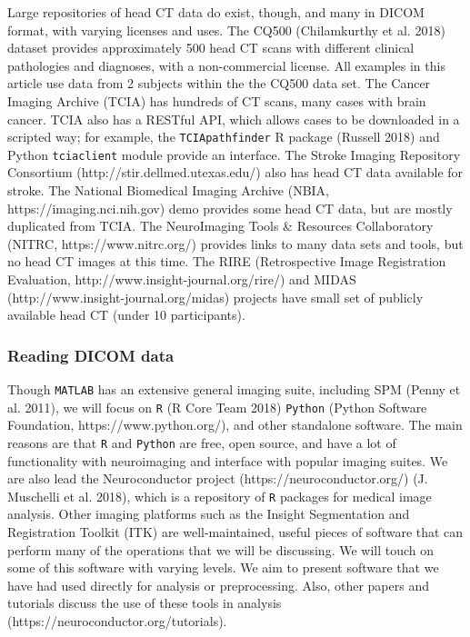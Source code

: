 \documentclass[]{elsarticle} %
\begin{document}
Large repositories of head CT data do exist, though, and many in DICOM format, with varying licenses and uses. The CQ500 (Chilamkurthy et al. 2018) dataset provides approximately 500 head CT scans with different clinical pathologies and diagnoses, with a non-commercial license. All examples in this article use data from 2 subjects within the the CQ500 data set. The Cancer Imaging Archive (TCIA) has hundreds of CT scans, many cases with brain cancer. TCIA also has a RESTful API, which allows cases to be downloaded in a scripted way; for example, the \texttt{TCIApathfinder} R package (Russell 2018) and Python \texttt{tciaclient} module provide an interface. The Stroke Imaging Repository Consortium (http://stir.dellmed.utexas.edu/) also has head CT data available for stroke. The National Biomedical Imaging Archive (NBIA, https://imaging.nci.nih.gov) demo provides some head CT data, but are mostly duplicated from TCIA. The NeuroImaging Tools \& Resources Collaboratory (NITRC, https://www.nitrc.org/) provides links to many data sets and tools, but no head CT images at this time. The RIRE (Retrospective Image Registration Evaluation, http://www.insight-journal.org/rire/) and MIDAS (http://www.insight-journal.org/midas) projects have small set of publicly available head CT (under 10 participants).

\hypertarget{reading-dicom-data}{%
\subsubsection{Reading DICOM data}\label{reading-dicom-data}}

Though \texttt{MATLAB} has an extensive general imaging suite, including SPM (Penny et al. 2011), we will focus on \texttt{R} (R Core Team 2018) \texttt{Python} (Python Software Foundation, https://www.python.org/), and other standalone software. The main reasons are that \texttt{R} and \texttt{Python} are free, open source, and have a lot of functionality with neuroimaging and interface with popular imaging suites. We are also lead the Neuroconductor project (https://neuroconductor.org/) (J. Muschelli et al. 2018), which is a repository of \texttt{R} packages for medical image analysis. Other imaging platforms such as the Insight Segmentation and Registration Toolkit (ITK) are well-maintained, useful pieces of software that can perform many of the operations that we will be discussing. We will touch on some of this software with varying levels. We aim to present software that we have had used directly for analysis or preprocessing. Also, other papers and tutorials discuss the use of these tools in analysis (https://neuroconductor.org/tutorials).
\end{document}
